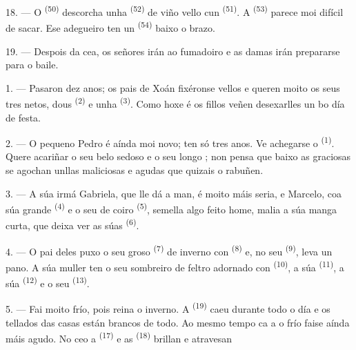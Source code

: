 18. --- O  \textsuperscript{(50)} descorcha unha 
\textsuperscript{(52)} de viño vello cun 
\textsuperscript{(51)}. A  \textsuperscript{(53)} parece moi
difícil de sacar. Ese adegueiro ten un 
\textsuperscript{(54)} baixo o brazo.

19. --- Despois da cea, os señores irán ao fumadoiro e as damas irán prepararse para o
baile.

\VUsaut{5.0mm}
\VUsaut{1.6mm}
\VUsaut{2.6mm}

\VUsaut{3.0mm}

1. --- Pasaron dez anos; os pais de Xoán fixéronse vellos e queren moito os seus tres
netos, dous  \textsuperscript{(2)} e unha 
\textsuperscript{(3)}. Como hoxe é  os fillos veñen desexarlles
un bo día de festa.

2. --- O pequeno Pedro é aínda moi novo; ten só tres anos. Ve achegarse o
 \textsuperscript{(1)}. Quere acariñar o seu belo  sedoso e
o seu longo ; non pensa que baixo as graciosas  se agochan
unllas maliciosas e agudas que quizais o rabuñen.

3. --- A súa irmá Gabriela, que lle dá a man, é moito máis seria, e Marcelo, coa súa
grande  \textsuperscript{(4)} e o seu  de coiro
\textsuperscript{(5)}, semella algo feito home, malia a súa manga curta, que deixa ver
as súas  \textsuperscript{(6)}.

4. --- O pai deles puxo o seu groso  \textsuperscript{(7)} de
inverno con  \textsuperscript{(8)} e, no seu 
\textsuperscript{(9)}, leva un pano. A súa muller ten o seu sombreiro de feltro
adornado con  \textsuperscript{(10)}, a súa 
\textsuperscript{(11)}, a súa  \textsuperscript{(12)} e o seu
 \textsuperscript{(13)}.

5. --- Fai moito frío, pois reina o inverno. A  \textsuperscript{(19)}
caeu durante todo o día e os tellados das casas están brancos de todo. Ao mesmo tempo
ca a  o frío faise aínda máis agudo. No ceo a 
\textsuperscript{(17)} e as  \textsuperscript{(18)} brillan e
atravesan 

